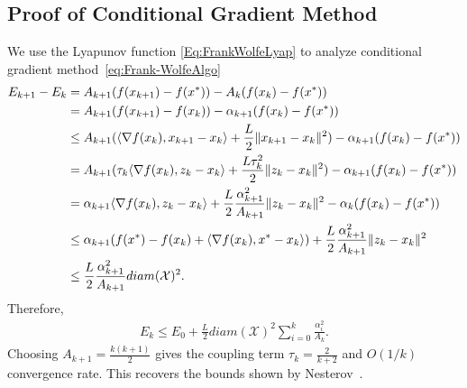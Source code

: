 \documentclass[11pt]{article}
\theoremstyle{plain}
\newcommand{\X}{{\mathcal X}}
\begin{document}
\subsection{Proof of Conditional Gradient Method}
\label{App:CondMethod}
We use the Lyapunov function \eqref{Eq:FrankWolfeLyap} to analyze conditional gradient method~\eqref{eq:Frank-WolfeAlgo}
\label{App:ProofAccGrad}
\begin{subequations}
\begin{align*}
E_{k+1} - E_k &= A_{k+1}(f(x_{k+1}) -f(x^\ast)) - A_k(f(x_k) - f(x^\ast)) \notag\\
& = A_{k+1}(f(x_{k+1}) -f(x_k)) - \alpha_{k+1}(f(x_k) - f(x^\ast))\notag\\
&  \leq A_{k+1}(\langle \nabla f(x_k), x_{k+1} - x_k \rangle + \frac{L}{2}\|x_{k+1} - x_k\|^2) - \alpha_{k+1} (f(x_k) - f(x^\ast)) \\
& = A_{k+1}(\tau_k\langle \nabla f(x_k), z_k- x_k \rangle + \frac{L\tau_k^2}{2}\|z_k - x_k\|^2) - \alpha_{k+1} (f(x_k) - f(x^\ast)) \\
&= \alpha_{k+1} \langle \nabla f(x_k), z_k- x_k \rangle + \frac{L}{2}\frac{\alpha_{k+1}^2}{A_{k+1}}\|z_k - x_k\|^2 - \alpha_{k} (f(x_k) - f(x^\ast))\\
& \leq \alpha_{k+1} ( f(x^\ast) - f(x_k) + \langle \nabla f(x_k), x^\ast -  x_k \rangle) + \frac{L}{2}\frac{\alpha_{k+1}^2}{A_{k+1}}\|z_k - x_k\|^2  \\
& \leq \frac{L}{2}\frac{\alpha_{k+1}^2}{A_{k+1}}diam(\X)^2.
\end{align*}
\end{subequations}
Therefore, 
\begin{align*}
E_k \leq E_0 + \frac{L}{2} diam(\X)^2\sum_{i=0}^k \frac{\alpha_{i}^2}{A_{k}}.
\end{align*}
Choosing $A_{k+1} = \frac{k(k+1)}{2}$ gives the coupling term $\tau_k = \frac{2}{k+2}$ and $O(1/k)$ convergence rate. This recovers the bounds shown by Nesterov~\cite{NesterovCond15}. 
\end{document}
